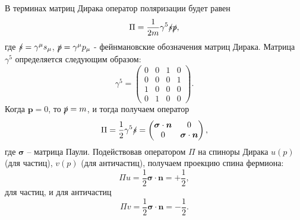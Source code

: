 \documentclass{extreport}
\begin{document}
В терминах матриц Дирака оператор поляризации будет равен
\begin{equation}
	\Pi = \frac{1}{2m} \gamma^5 \slashed{s} \slashed{p}, 
\end{equation}
где $\slashed{s} = \gamma^\mu s_\mu$, $\slashed{p} = \gamma^\mu p_\mu$ - фейнмановские обозначения матриц Дирака. Матрица $\gamma^5$ определяется следующим образом:
\begin{equation}
	\gamma^5 =  \begin{pmatrix}
		0 &  0 & 1 & 0 \\
		0 & 0 & 0 & 1 \\
		1 & 0 & 0 & 0 \\
		0 & 1 & 0 & 0
	\end{pmatrix}.
\end{equation}
Когда $\textbf{p}=0$, то $\slashed{p} = m$, и тогда получаем оператор
\begin{equation}
	\Pi = \frac{1}{2} \gamma^5 \slashed{s} = \begin{pmatrix}
		\boldsymbol{\sigma} \cdot \boldsymbol{n} & 0 \\ 0 & \boldsymbol{\sigma} \cdot \boldsymbol{n}
	\end{pmatrix},
\end{equation}
где $\boldsymbol{\sigma}$ -- матрица Паули. Подействовав оператором $\Pi$ на спиноры Дирака $u(p)$ (для частиц), $v(p)$ (для античастиц), получаем проекцию спина фермиона:
\begin{equation}
	\Pi u = \frac{1}{2} \boldsymbol{\sigma} \cdot \boldsymbol{n} = + \frac{1}{2}, 
\end{equation}
для частиц, и для античастиц
\begin{equation}
	\Pi v = \frac{1}{2} \boldsymbol{\sigma} \cdot \boldsymbol{n} = - \frac{1}{2}.
\end{equation}
\end{document}
